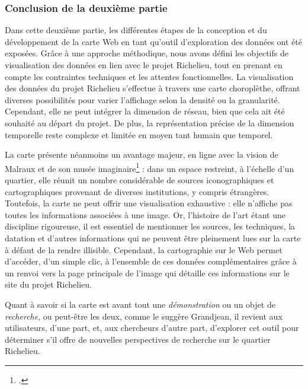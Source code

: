 \subsubsection{Conclusion de la deuxième partie}
Dans cette deuxième partie, les différentes étapes de la conception et du développement de la carte Web en tant qu'outil d'exploration des données ont été exposées. Grâce à une approche méthodique, nous avons défini les objectifs de visualisation des données en lien avec le projet Richelieu, tout en prenant en compte les contraintes techniques et les attentes fonctionnelles. La visualisation des données du projet Richelieu s'effectue à travers une carte choroplèthe, offrant diverses possibilités pour varier l'affichage selon la densité ou la granularité. Cependant, elle ne peut intégrer la dimension de réseau, bien que cela ait été souhaité au départ du projet. De plus, la représentation précise de la dimension temporelle reste complexe et limitée en moyen tant humain que temporel.

La carte présente néanmoins un avantage majeur, en ligne avec la vision de Malraux et de son musée imaginaire\footcite{MALRAUXMusee1996} : dans un espace restreint, à l'échelle d'un quartier, elle réunit un nombre considérable de sources iconographiques et cartographiques provenant de diverses institutions, y compris étrangères. Toutefois, la carte ne peut offrir une visualisation exhaustive : elle n'affiche pas toutes les informations associées à une image. Or, l'histoire de l'art étant une discipline rigoureuse, il est essentiel de mentionner les sources, les techniques, la datation et d'autres informations qui ne peuvent être pleinement lues sur la carte à défaut de la rendre illisible. Cependant, la cartographie sur le Web permet d'accéder, d'un simple clic, à l'ensemble de ces données complémentaires grâce à un renvoi vers la page principale de l'image qui détaille ces informations sur le site du projet Richelieu.

Quant à savoir si la carte est avant tout une \textit{démonstration} ou un objet de \textit{recherche}, ou peut-être les deux, comme le suggère Grandjean, il revient aux utilisateurs, d'une part, et, aux chercheurs d'autre part,  d'explorer cet outil pour déterminer s'il offre de nouvelles perspectives de recherche sur le quartier Richelieu.